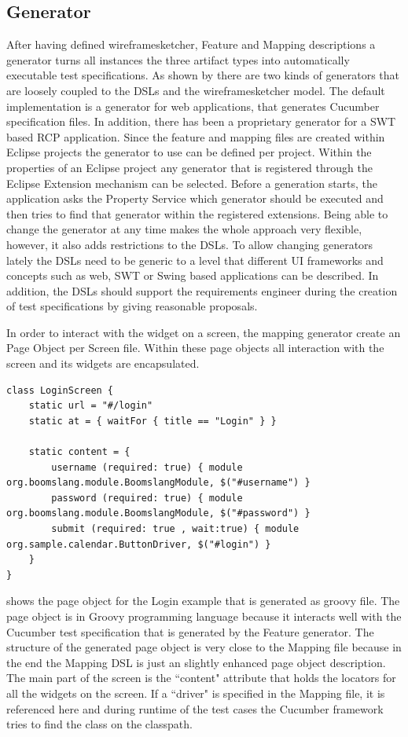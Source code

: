 \documentclass{sig-alternate-05-2015}
\begin{document}
\subsection{Generator}\label{sec:Generator} 
After having defined wireframesketcher, Feature and Mapping descriptions a generator turns all instances the three artifact types into automatically executable test specifications.
As shown by  there are two kinds of generators that are loosely coupled to the DSLs and the wireframesketcher model.
The default implementation is a generator for web applications, that generates Cucumber specification files.
In addition, there has been a proprietary generator for a SWT based RCP application.
Since the feature and mapping files are created within Eclipse projects the generator to use can be defined per project.
Within the properties of an Eclipse project any generator that is registered through the Eclipse Extension mechanism can be selected.
Before a generation starts, the application asks the Property Service which generator should be executed and then tries to find that generator within the registered extensions.
Being able to change the generator at any time makes the whole approach very flexible, however, it also adds restrictions to the DSLs.
To allow changing generators lately the DSLs need to be generic to a level that different UI frameworks and concepts such as web, SWT or Swing based applications can be described.
In addition, the DSLs should support the requirements engineer during the creation of test specifications by giving reasonable proposals.

In order to interact with the widget on a screen, the mapping generator create an Page Object \cite{fowler.2013} per Screen file.
Within these page objects all interaction with the screen and its widgets are encapsulated.

\begin{lstlisting}[captionpos=b, caption=Generated Page Object, label={lst:MappingGenerated}, language=dsl]
class LoginScreen {
	static url = "#/login"
	static at = { waitFor { title == "Login" } }
	
	static content = {
		username (required: true) { module org.boomslang.module.BoomslangModule, $("#username") }
		password (required: true) { module org.boomslang.module.BoomslangModule, $("#password") }
		submit (required: true , wait:true) { module org.sample.calendar.ButtonDriver, $("#login") }
	}
}
\end{lstlisting}

 shows the page object for the Login example that is generated as groovy file.
The page object is in Groovy programming language because it interacts well with the Cucumber test specification that is generated by the Feature generator.
The structure of the generated page object is very close to the Mapping file because in the end the Mapping DSL is just an slightly enhanced page object description.
The main part of the screen is the ``content" attribute that holds the locators for all the widgets on the screen.
If a ``driver" is specified in the Mapping file, it is referenced here and during runtime of the test cases the Cucumber framework tries to find the class on the classpath.
\end{document}
